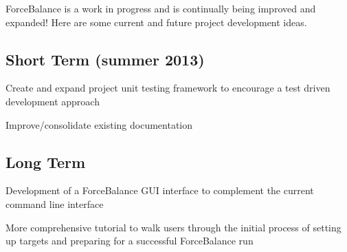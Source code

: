Force\-Balance is a work in progress and is continually being improved and expanded! Here are some current and future project development ideas.\hypertarget{roadmap_summer}{}\subsection{Short Term (summer 2013)}\label{roadmap_summer}
\begin{DoxyItemize}
\item Create and expand project unit testing framework to encourage a test driven development approach \item Improve/consolidate existing documentation\end{DoxyItemize}
\hypertarget{roadmap_longterm}{}\subsection{Long Term}\label{roadmap_longterm}
\begin{DoxyItemize}
\item Development of a Force\-Balance G\-U\-I interface to complement the current command line interface \item More comprehensive tutorial to walk users through the initial process of setting up targets and preparing for a successful Force\-Balance run \end{DoxyItemize}
